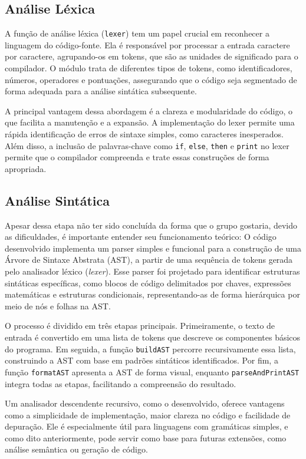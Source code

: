 \documentclass{article}
\begin{document}
\subsection{Análise Léxica}

A função de análise léxica (\texttt{lexer}) tem um papel crucial em reconhecer a linguagem do código-fonte. Ela é responsável por processar a entrada caractere por caractere, agrupando-os em tokens, que são as unidades de significado para o compilador. O módulo trata de diferentes tipos de tokens, como identificadores, números, operadores e pontuações, assegurando que o código seja segmentado de forma adequada para a análise sintática subsequente.

A principal vantagem dessa abordagem é a clareza e modularidade do código, o que facilita a manutenção e a expansão. A implementação do lexer permite uma rápida identificação de erros de sintaxe simples, como caracteres inesperados. Além disso, a inclusão de palavras-chave como \texttt{if}, \texttt{else}, \texttt{then} e \texttt{print} no lexer permite que o compilador compreenda e trate essas construções de forma apropriada.

\subsection{Análise Sintática}

Apesar dessa etapa não ter sido concluída da forma que o grupo gostaria, devido as dificuldades, é importante entender seu funcionamento teórico: O código desenvolvido implementa um parser simples e funcional para a construção de uma Árvore de Sintaxe Abstrata (AST), a partir de uma sequência de tokens gerada pelo analisador léxico (\textit{lexer}). Esse parser foi projetado para identificar estruturas sintáticas específicas, como blocos de código delimitados por chaves, expressões matemáticas e estruturas condicionais, representando-as de forma hierárquica por meio de nós e folhas na AST.

O processo é dividido em três etapas principais. Primeiramente, o texto de entrada é convertido em uma lista de tokens que descreve os componentes básicos do programa. Em seguida, a função \texttt{buildAST} percorre recursivamente essa lista, construindo a AST com base em padrões sintáticos identificados. Por fim, a função \texttt{formatAST} apresenta a AST de forma visual, enquanto \texttt{parseAndPrintAST} integra todas as etapas, facilitando a compreensão do resultado.

Um analisador descendente recursivo, como o desenvolvido, oferece vantagens como a simplicidade de implementação, maior clareza no código e facilidade de depuração. Ele é especialmente útil para linguagens com gramáticas simples, e como dito anteriormente, pode servir como base para futuras extensões, como análise semântica ou geração de código.
\end{document}
